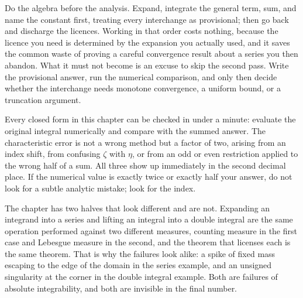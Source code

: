\begin{keynote}
Do the algebra before the analysis. Expand, integrate the general term, sum, and name the constant first, treating every interchange as provisional; then go back and discharge the licences. Working in that order costs nothing, because the licence you need is determined by the expansion you actually used, and it saves the common waste of proving a careful convergence result about a series you then abandon. What it must not become is an excuse to skip the second pass. Write the provisional answer, run the numerical comparison, and only then decide whether the interchange needs monotone convergence, a uniform bound, or a truncation argument.
\end{keynote}

\begin{keynote}
Every closed form in this chapter can be checked in under a minute: evaluate the original integral numerically and compare with the summed answer. The characteristic error is not a wrong method but a factor of two, arising from an index shift, from confusing $\zeta$ with $\eta$, or from an odd or even restriction applied to the wrong half of a sum. All three show up immediately in the second decimal place. If the numerical value is exactly twice or exactly half your answer, do not look for a subtle analytic mistake; look for the index.
\end{keynote}

The chapter has two halves that look different and are not. Expanding an integrand into a series and lifting an integral into a double integral are the same operation performed against two different measures, counting measure in the first case and Lebesgue measure in the second, and the theorem that licenses each is the same theorem. That is why the failures look alike: a spike of fixed mass escaping to the edge of the domain in the series example, and an unsigned singularity at the corner in the double integral example. Both are failures of absolute integrability, and both are invisible in the final number.

